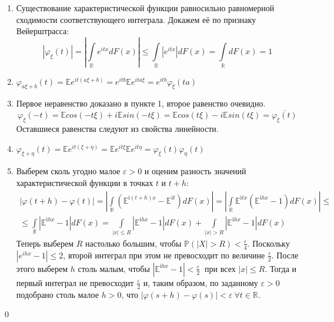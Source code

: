 \documentclass[oneside,final,14pt]{extreport}
\renewenvironment{proof}{{\bfseries Доказательство.}}{\qed}
\theoremstyle{definition}
\begin{document}
\begin{proof}
    \begin{enumerate}
        \item Существование характеристической функции равносильно равномерной сходимости соответствующего интеграла. Докажем её по признаку Вейерштрасса:
        \begin{equation*}
            \left|\varphi_{\xi}(t)\right|=\left|\int\limits_{\mathbb{R}} e^{i t x} d F(x)\right| \leqslant \int\limits_{\mathbb{R}}\left|e^{i t x}\right| d F(x)=\int\limits_{\mathbb{R}} d F(x)=1
        \end{equation*}
        \item $\varphi_{a \xi+b}(t) 
        = \mathbb{E}e^{i t(a \xi+b)}
        = e^{i t b} \mathbb{E}e^{i t a \xi}
        = e^{i t b} \varphi_{\xi}(t a)$
        \item Первое неравенство доказано в пункте 1, второе равенство очевидно.
        \begin{equation*}
            \varphi_{\xi}(-t) = \mathbb{E}cos(-t \xi) + i\mathbb{E}sin(-t \xi) = \mathbb{E}cos(t \xi) - i\mathbb{E}sin(t \xi) = \overline{\varphi_{\xi}(t)}
        \end{equation*}
        Оставшиеся равенства следуют из свойства линейности.
        \item $\varphi_{\xi + \eta}(t) 
        = \mathbb{E}e^{it(\xi + \eta)} 
        = \mathbb{E}e^{it\xi}\mathbb{E}e^{it\eta}
        = \varphi_{\xi}(t)\varphi_{\eta}(t)$
        \item Выберем сколь угодно малое $\varepsilon > 0$ и оценим разность значений характеристической функции в точках $t$ и $t + h$:
        \begin{multline*}
            |\varphi(t+h)-\varphi(t)| 
            = \left|\int\limits_{\mathbb{R}} \left(\mathbb{E}^{\mathrm{i}(t+h) x}-\mathbb{E}^{\mathrm{i} t}\right) d F(x)\right|
            = \left|\int\limits_{\mathbb{R}} \mathbb{E}^{\mathrm{i} t x}\left(\mathbb{E}^{\mathrm{i} h x}-1\right) d F(x)\right| \leqslant \\
            \leqslant \int\limits_{\mathbb{R}} \left|\mathbb{E}^{\mathrm{i} h x}-1\right| d F(x)=\int\limits_{|x| \leqslant R}\left|\mathbb{E}^{\mathrm{i} h x}-1\right| d F(x)+\int\limits_{|x|>R}\left|\mathbb{E}^{\mathrm{i} h x}-1\right| d F(x)
        \end{multline*}
        Теперь выберем $R$ настолько большим, чтобы $\mathbb{P}(|X|>R) < \frac{\varepsilon}{4}$. Поскольку $\left|e^{i h x}-1\right| \leqslant 2$, второй интеграл при этом не превосходит по величине $\frac{\varepsilon}{2}$. После этого выберем $h$ столь малым, чтобы $\left|\mathbb{E}^{\mathrm{i} h x}-1\right|<\frac{\varepsilon}{2}~$ при всех $|x| \leqslant R$. Тогда и первый интеграл не превосходит $\frac{\varepsilon}{2}$ и, таким образом, по заданному $\varepsilon > 0$ подобрано столь малое $h >0$, что $|\varphi(s+h)-\varphi(s)|<\varepsilon~ \forall t \in \mathbb{R}$.

\end{enumerate}
\end{proof}
\end{document}
